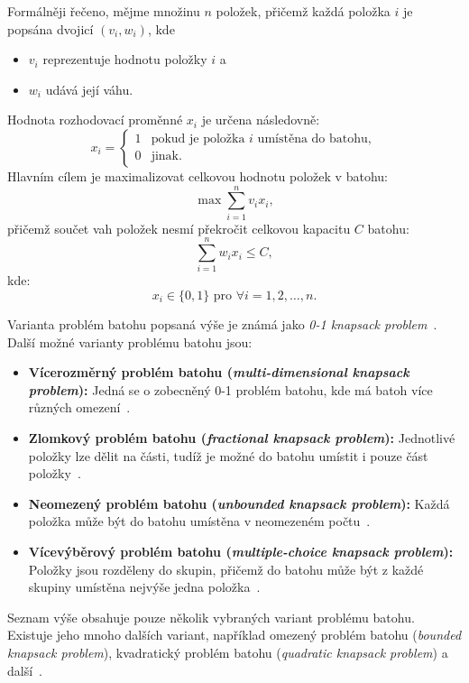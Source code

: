 Formálněji řečeno, mějme množinu $n$ položek, přičemž každá položka $i$ je popsána dvojicí $\left( v_i, w_i \right)$, kde
\begin{itemize}
    \item $v_i$ reprezentuje hodnotu položky $i$ a
    \item $w_i$ udává její váhu.
\end{itemize}
Hodnota rozhodovací proměnné $x_i$ je určena následovně:
\begin{equation*}
    x_i =
    \begin{cases}
        1 & \text{pokud je položka } i \text{ umístěna do batohu}, \\
        0 & \text{jinak}.
    \end{cases}    
\end{equation*}
Hlavním cílem je maximalizovat celkovou hodnotu položek v batohu:
\begin{equation*}
    \max \sum_{i=1}^{n} v_i x_i,
\end{equation*}
přičemž součet vah položek nesmí překročit celkovou kapacitu $C$ batohu:
\begin{equation} \label{eq:knapsack-capacity}
    \sum_{i=1}^{n} w_i x_i \leq C,
\end{equation}
kde:
\begin{equation*}
    x_i \in \{0,1\} \text{ pro } \forall i = 1,2,\dots,n.
\end{equation*}

Varianta problém batohu popsaná výše je známá jako \emph{0-1 knapsack problem}~\cite{knapsack01-survey}. 
Další možné varianty problému batohu jsou:
\begin{itemize}
    \item \textbf{Vícerozměrný problém batohu (\emph{multi-dimensional knapsack problem}):} Jed\-ná se o zobecněný 0-1 problém batohu, kde má batoh více různých omezení~\cite{multidimensional-knapsack}.
    \item \textbf{Zlomkový problém batohu (\emph{fractional knapsack problem}):} Jednotlivé položky lze dělit na části, tudíž je možné do batohu umístit i pouze část položky~\cite{IntroductionToAlgorithms}.
    \item \textbf{Neomezený problém batohu (\emph{unbounded knapsack problem}):} Každá položka může být do batohu umístěna v neomezeném počtu~\cite{unbounded-knapsack}.
    \item \textbf{Vícevýběrový problém batohu (\emph{multiple-choice knapsack problem}):} Položky jsou rozděleny do skupin, přičemž do batohu může být z každé skupiny umístěna nejvýše jedna položka~\cite{knapsack-problems}.
\end{itemize}
Seznam výše obsahuje pouze několik vybraných variant problému batohu. 
Existuje jeho mnoho dalších variant, například omezený problém batohu (\emph{bounded knapsack problem}), kvadratický problém batohu (\emph{quadratic knapsack problem}) a další~\cite{knapsack-problems,knapsack-problems-overview-I,knapsack-problems-overview-II}.

